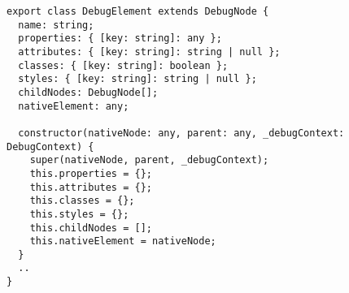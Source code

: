 \begin{verbatim}
export class DebugElement extends DebugNode {
  name: string;
  properties: { [key: string]: any };
  attributes: { [key: string]: string | null };
  classes: { [key: string]: boolean };
  styles: { [key: string]: string | null };
  childNodes: DebugNode[];
  nativeElement: any;

  constructor(nativeNode: any, parent: any, _debugContext: DebugContext) {
    super(nativeNode, parent, _debugContext);
    this.properties = {};
    this.attributes = {};
    this.classes = {};
    this.styles = {};
    this.childNodes = [];
    this.nativeElement = nativeNode;
  }
  ..
}
\end{verbatim}
